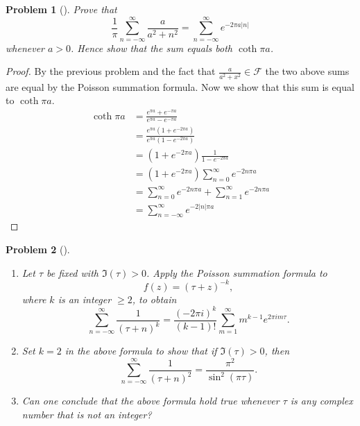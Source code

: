 \documentclass[10pt]{article}
\newcommand{\sk}{\vskip 10mm}
\theoremstyle{plain}
\newtheorem{problem}{Problem}
\theoremstyle{remark}
\begin{document}
\sk

\begin{problem}[]
  Prove that 
  \[
    \frac{1}{\pi} \sum_{n = -\infty}^\infty 
    \frac{a}{a^2 + n^2} = \sum_{n = -\infty}^\infty e^{-2\pi a|n|}
  \]
  whenever $a>0$. Hence show that the sum equals both $\coth \pi a$.
\end{problem}

\begin{proof}
  By the previous problem and the fact that $\frac{a}{a^2+x^2}\in\mathcal{F}$ the two
  above sums are equal by the Poisson summation formula. Now we show that this sum
  is equal to $\coth\pi a$.
  \begin{align*}
    \coth\pi a &= \frac{e^{\pi a}+e^{-\pi a}}{e^{\pi a}-e^{-\pi a}}\\
             &= \frac{e^{\pi a} (1+e^{-2\pi a})}{e^{\pi a}(1-e^{-2\pi a})}\\
             &= (1+e^{-2\pi a})\frac{1}{1-e^{-2\pi a}}\\
             &= (1+e^{-2\pi a})\sum_{n=0}^\infty e^{-2n\pi a}\\
             &= \sum_{n=0}^\infty e^{-2n\pi a}+\sum_{n=1}^\infty e^{-2 n\pi a}\\
             &= \sum_{n=-\infty}^\infty e^{-2|n|\pi a}
  \end{align*}
\end{proof}

\sk

\begin{problem}[]
  \begin{enumerate}
  \item[(a)] Let $\tau$ be fixed with $\Im(\tau)>0$. Apply the Poisson summation
    formula to
    \[
      f(z) = (\tau + z)^{-k},
    \]
    where $k$ is an integer $\geq 2$, to obtain
    \[
      \sum_{n = -\infty}^\infty\frac{1}{(\tau +n)^k} = \frac{(-2\pi i )^k}{(k-1)!} \sum_{m=1}^{\infty} m^{k-1}e^{2\pi im\tau}.
    \]
  \item[(b)] Set $k=2$ in the above formula to show that if $\Im(\tau)>0$, then 
    \[
      \sum_{n = -\infty}^\infty 
      \frac{1}{(\tau +n)^2} = \frac{\pi^2}{\sin^2(\pi\tau)}.
    \]
  \item[(c)] Can one conclude that the above formula hold true whenever $\tau$
    is any complex number that is not an integer?
  \end{enumerate}
\end{problem}
\end{document}
